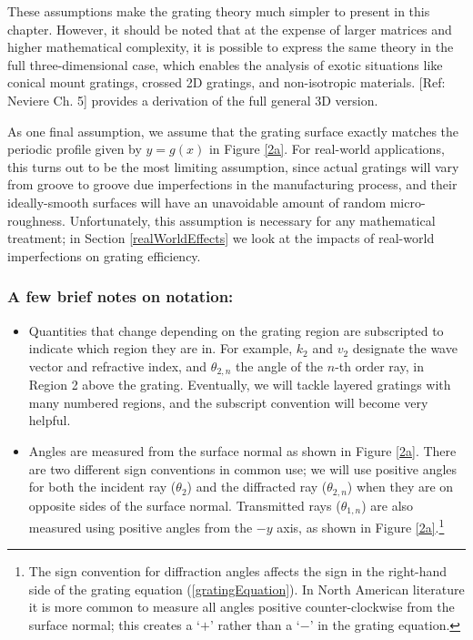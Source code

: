 These assumptions make the grating theory much simpler to present in this chapter. However, it should be noted that at the expense of larger matrices and higher mathematical complexity, it is possible to express the same theory in the full three-dimensional case, which enables the analysis of exotic situations like conical mount gratings, crossed 2D gratings, and non-isotropic materials.  [Ref: Neviere Ch. 5] provides a derivation of the full general 3D version.

As one final assumption, we assume that the grating surface exactly matches the periodic profile given by $y=g(x)$ in Figure \ref{2a}.  For real-world applications, this turns out to be the most limiting assumption, since actual gratings will vary from groove to groove due imperfections in the manufacturing process, and their ideally-smooth surfaces will have an unavoidable amount of random micro-roughness.  Unfortunately, this assumption is necessary for any mathematical treatment; in Section \ref{realWorldEffects} we look at the impacts of real-world  imperfections on grating efficiency.

\subsubsection{A few brief notes on notation:}
\begin{itemize}
\item Quantities that change depending on the grating region are subscripted to indicate which region they are in.  For example, $k_2$ and $v_2$ designate the wave vector and refractive index, and $\theta_{2,n}$ the angle of the $n$-th order ray, in Region 2 above the grating.  Eventually, we will tackle layered gratings with many numbered regions, and the subscript convention will become very helpful.
\item Angles are measured from the surface normal as shown in Figure \ref{2a}.  There are two different sign conventions in common use; we will use positive angles for both the incident ray ($\theta_2$) and the diffracted ray ($\theta_{2,n}$) when they are on opposite sides of the surface normal.  Transmitted rays ($\theta_{1,n}$) are also measured using positive angles from the $-y$ axis, as shown in Figure \ref{2a}.\footnote{The sign convention for diffraction angles affects the sign in the right-hand side of the grating equation (\ref{gratingEquation}).  In North American literature it is more common to measure all angles positive counter-clockwise from the surface normal; this creates a `$+$' rather than a `$-$' in the grating equation.}
\end{itemize}

